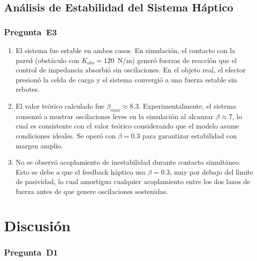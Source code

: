 \documentclass[journal,10pt,twoside]{IEEEtran}
\begin{document}
\subsection{Análisis de Estabilidad del Sistema Háptico}

\subsubsection*{Pregunta~E3}

\begin{enumerate}[label=(\alph*)]

\item El sistema fue estable en ambos casos. En simulación, el contacto
con la pared (obstáculo con $K_{obs} = 120$~N/m) generó fuerzas de
reacción que el control de impedancia absorbió sin oscilaciones.
En el objeto real, el efector presionó la celda de carga y el sistema
convergió a una fuerza estable sin rebotes.

\item El valor teórico calculado fue $\beta_{max} \approx 8.3$.
Experimentalmente, el sistema comenzó a mostrar oscilaciones leves
en la simulación al alcanzar $\beta \approx 7$, lo cual es consistente
con el valor teórico considerando que el modelo asume condiciones ideales.
Se operó con $\beta = 0.3$ para garantizar estabilidad con margen amplio.

\item No se observó acoplamiento de inestabilidad durante contacto
simultáneo. Esto se debe a que el feedback háptico usa $\beta = 0.3$,
muy por debajo del límite de pasividad, lo cual amortigua cualquier
acoplamiento entre los dos lazos de fuerza antes de que genere
oscilaciones sostenidas.

\end{enumerate}

\section{Discusión}
\label{sec:discussion}

\subsubsection*{Pregunta~D1}
\end{document}
